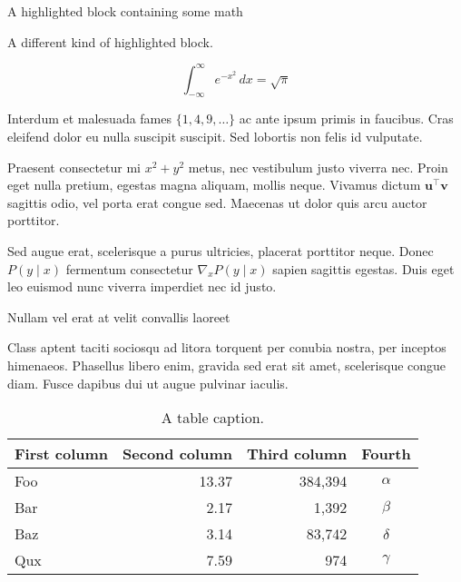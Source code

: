 \documentclass[final]{beamer}
\newlength{\colwidth}
\begin{document}
\begin{frame}[t]
\begin{columns}[t]
\begin{column}{\colwidth}
  \begin{exampleblock}{A highlighted block containing some math}

    A different kind of highlighted block.

    $$
    \int_{-\infty}^{\infty} e^{-x^2}\,dx = \sqrt{\pi}
    $$

    Interdum et malesuada fames $\{1, 4, 9, \ldots\}$ ac ante ipsum primis in
    faucibus. Cras eleifend dolor eu nulla suscipit suscipit. Sed lobortis non
    felis id vulputate.


    Praesent consectetur mi $x^2 + y^2$ metus, nec vestibulum justo viverra
    nec. Proin eget nulla pretium, egestas magna aliquam, mollis neque. Vivamus
    dictum $\mathbf{u}^\intercal\mathbf{v}$ sagittis odio, vel porta erat
    congue sed. Maecenas ut dolor quis arcu auctor porttitor.


    Sed augue erat, scelerisque a purus ultricies, placerat porttitor neque.
    Donec $P(y \mid x)$ fermentum consectetur $\nabla_x P(y \mid x)$ sapien
    sagittis egestas. Duis eget leo euismod nunc viverra imperdiet nec id
    justo.

  \end{exampleblock}

  \begin{block}{Nullam vel erat at velit convallis laoreet}

    Class aptent taciti sociosqu ad litora torquent per conubia nostra, per
    inceptos himenaeos. Phasellus libero enim, gravida sed erat sit amet,
    scelerisque congue diam. Fusce dapibus dui ut augue pulvinar iaculis.

    \begin{table}
      \centering
      \begin{tabular}{l r r c}
        \toprule
        \textbf{First column} & \textbf{Second column} & \textbf{Third column} & \textbf{Fourth} \\
        \midrule
        Foo & 13.37 & 384,394 & $\alpha$ \\
        Bar & 2.17 & 1,392 & $\beta$ \\
        Baz & 3.14 & 83,742 & $\delta$ \\
        Qux & 7.59 & 974 & $\gamma$ \\
        \bottomrule
      \end{tabular}
      \caption{A table caption.}
    \end{table}


\end{block}
\end{column}
\end{columns}
\end{frame}
\end{document}
